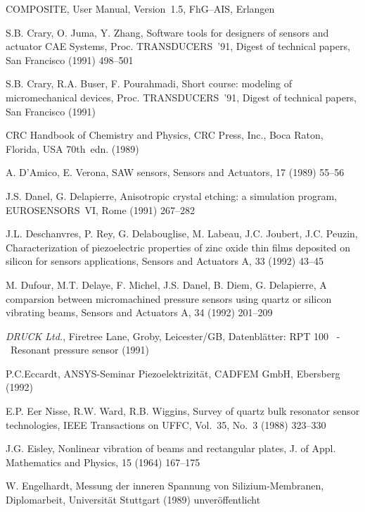 \begin{thebibliography}{xxx}
 {\sf COMPOSITE}, User Manual, Version~1.5, FhG--AIS, Erlangen

 S.B. Crary, O. Juma, Y. Zhang, Software tools for designers of sensors and
 actuator CAE Systems, Proc. TRANSDUCERS~'91, Digest of technical papers,
 San Francisco (1991) 498--501

 S.B. Crary, R.A. Buser, F. Pourahmadi, Short course: modeling of
 micromechanical devices, Proc. TRANSDUCERS~'91, Digest of technical papers,
 San Francisco (1991)

 CRC Handbook of Chemistry and Physics, CRC Press, Inc., Boca Raton,
 Florida, USA 70th~edn. (1989)

  A. D'Amico, E. Verona, SAW sensors, Sensors and Actuators, 17 (1989) 55--56

 J.S. Danel, G. Delapierre, Anisotropic crystal etching: a simulation
 program, EUROSENSORS~VI, Rome (1991) 267--282

 J.L. Deschanvres, P. Rey, G. Delabouglise, M. Labeau, J.C. Joubert,
 J.C. Peuzin, Characterization of piezoelectric properties of zinc oxide
 thin films deposited on silicon for sensors applications, Sensors and
 Actuators A, 33 (1992) 43--45

 M. Dufour, M.T. Delaye, F. Michel, J.S. Danel, B. Diem, G. Delapierre,
 A comparsion between micromachined pressure sensors using quartz or silicon
 vibrating beams, Sensors and Actuators A, 34 (1992) 201--209

 {\em DRUCK Ltd.}, Firetree Lane, Groby, Leicester/GB, Datenblätter:
 {\sf RPT 100} ~-~Resonant pressure sensor (1991)

 P.C.Eccardt, {\sf ANSYS}\--Seminar Piezo\-elek\-tri\-zi\-tät,
 CAD\-FEM GmbH, Ebers\-berg (1992)

 E.P. Eer Nisse, R.W. Ward, R.B. Wiggins, Survey of quartz bulk resonator
 sensor technologies, IEEE Transactions on UFFC, Vol.~35, No.~3
 (1988) 323--330

 J.G. Eisley, Nonlinear vibration of beams and rectangular plates,
 J. of Appl. Mathematics and Physics, 15 (1964) 167--175

 W. Engelhardt, Messung der inneren Spannung von Silizium-Membranen,
 Diplomarbeit, Universität Stuttgart (1989) unveröffentlicht


\end{thebibliography}

